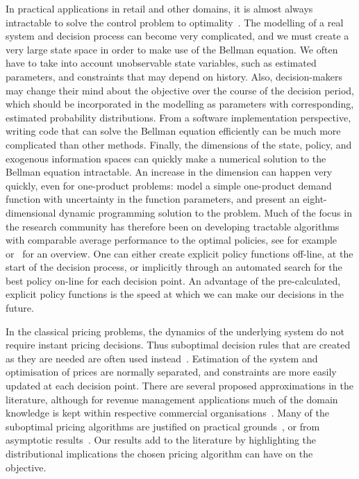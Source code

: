 \documentclass[main.tex]{subfiles}
\begin{document}
In practical applications in retail and other domains, it is almost always
intractable to solve the control problem to optimality~\citep{farmer2017uncertainty}.
The modelling of a real system and decision process can become very
complicated, and  we must  create a very
large state space in order to make use of the Bellman equation.
We often have to take into account unobservable
state variables, such as estimated parameters, and constraints
that may depend on history. Also, decision-makers may change their mind
about the objective over the course of the decision period, which should
be incorporated in the modelling as parameters with corresponding, estimated
probability distributions.
From a software implementation perspective, writing code that can
solve the Bellman equation efficiently can be much more complicated
than other methods.
Finally, the dimensions of the state, policy, and exogenous
information spaces can quickly make a numerical solution to the Bellman
equation intractable. An increase in the dimension can happen very
quickly, even for one-product problems:
\citet{bertsimas2001dynamic} model a simple
one-product demand function with uncertainty in the function
parameters, and present an eight-dimensional dynamic programming
solution to the problem.
Much of the focus in the research community has therefore been on
developing tractable algorithms with comparable average performance to the
optimal policies, see for
example~\citet{powell2011approximate} or~\citet{bertsekas2012dynamic}
for an overview.
One can either create explicit policy functions off-line, at the
start of the decision process, or implicitly through an automated
search for the best policy on-line for each decision point.
An advantage of the pre-calculated, explicit policy functions
is the speed at which we can make our decisions in the
future.

In the classical pricing problems, the dynamics of the
underlying system do not require instant pricing decisions. Thus
suboptimal decision rules that are created as they are needed are often used
instead~\citep{talluri2006theory}. Estimation of the system and optimisation of prices are
normally separated, and constraints are more easily updated at each
decision point.
There are several proposed approximations in the
literature, although for revenue management applications much of the domain knowledge is kept within
respective commercial organisations~\citep[Ch.~9]{talluri2006theory}.
Many of the suboptimal pricing algorithms are justified on practical
grounds~\citep{aviv2012dynamic}, or
from asymptotic results~\citep{gallego1994optimal}.
Our results add to the literature by highlighting the
distributional implications the chosen pricing algorithm can have on
the objective.
\end{document}
